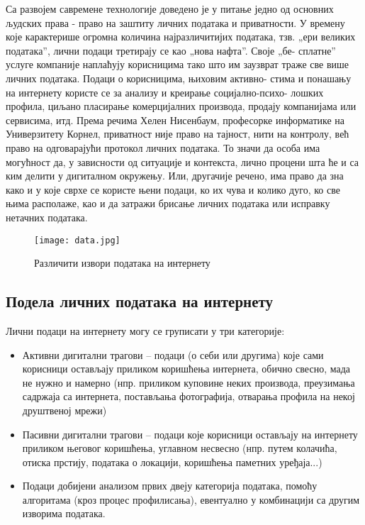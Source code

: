 \documentclass[a4paper]{article}
\begin{document}
Са развојем савремене технологије доведено је у питање једно од основних људских права - право на заштиту личних података и приватности. У времену које карактерише огромна количина најразличитијих података, тзв. „ери великих података”, лични подаци третирају се као „нова нафта”. Своје „бе-
сплатне” услуге компаније наплаћују корисницима тако што им заузврат траже све више личних података. Подаци о корисницима, њиховим активно-
стима и понашању на интернету користе се за анализу и креирање социјално-психо-
лошких профила, циљано пласирање комерцијалних производа, продају компанијама или сервисима, итд. Према речима Хелен Нисенбаум, професорке информатике на Универзитету Корнел, приватност није право на тајност, нити на контролу, већ право на одговарајући протокол личних података. То значи да особа има могућност да, у зависности од ситуације и контекста, лично процени шта ће и са ким делити у дигиталном окружењу. Или, другачије речено, има право да зна како и у које сврхе се користе њени подаци, ко их чува и колико дуго, ко све њима располаже, као и да затражи брисање личних података или исправку нетачних података.

\begin{figure}[hbt!]
\centering
\texttt{[image: data.jpg]}
\caption{Различити извори података на интернету}
\end{figure}

\subsection{Подела личних података на интернету}
\label{subsec:podnaslov1}

Лични подаци на интернету могу се груписати у три категорије:

\begin{itemize}
    \item Активни дигитални трагови – подаци (о себи или другима) које сами корисници остављају приликом коришћења интернета, обично свесно, мада не нужно и намерно (нпр. приликом куповине неких производа, преузимања садржаја са интернета, постављања фотографија, отварања профила на некој друштвеној мрежи)
    \item Пасивни дигитални трагови – подаци које корисници остављају на интернету приликом његовог коришћења, углавном несвесно (нпр. путем колачића, отиска прстију, података о локацији, коришћења паметних уређаја...)
    \item Подаци добијени анализом првих двеју категорија података, помоћу алгоритама (кроз процес профилисања), евентуално у комбинацији са другим изворима података.
\end{itemize}
\end{document}
